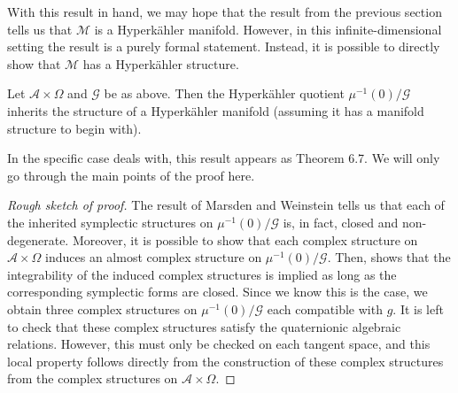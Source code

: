 With this result in hand, we may hope that the result from the previous section tells us that $\mathcal{M}$ is a Hyperk\"ahler manifold. However, in this infinite-dimensional setting the result is a purely formal statement. Instead, it is possible to directly show that $\mathcal{M}$ has a Hyperk\"ahler structure. 
\begin{prop}
  Let $\mathscr{A}\times\Omega$ and $\mathscr{G}$ be as above. Then the Hyperk\"ahler quotient $\mu^{-1}(0)/\mathscr{G}$ inherits the structure of a Hyperk\"ahler manifold (assuming it has a manifold structure to begin with). 
\end{prop}
In the specific case \cite{H1} deals with, this result appears as Theorem 6.7. We will only go through the main points of the proof here. 
\begin{proof}[Rough sketch of proof]
  The result of Marsden and Weinstein tells us that each of the inherited symplectic structures on $\mu^{-1}(0)/\mathscr{G}$ is, in fact, closed and non-degenerate. Moreover, it is possible to show that each complex structure on $\mathscr{A}\times\Omega$ induces an almost complex structure on $\mu^{-1}(0)/\mathscr{G}$. Then, \cite{H1} shows that the integrability of the induced complex structures is implied as long as the corresponding symplectic forms are closed. Since we know this is the case, we obtain three complex structures on $\mu^{-1}(0)/\mathscr{G}$ each compatible with $g$. It is left to check that these complex structures satisfy the quaternionic algebraic relations. However, this must only be checked on each tangent space, and this local property follows directly from the construction of these complex structures from the complex structures on 
$\mathscr{A}\times\Omega$. 
\end{proof}






